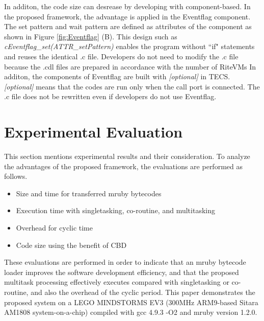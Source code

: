 \documentclass[conference,compsoc]{IEEEtran}
\begin{document}
In additon, the code size can desrease by developing with component-based. 
In the proposed framework, the advantage is applied in the Eventflag component.
The set pattern and wait pattern are defined as attributes of the component as shown in Figure \ref{fig:Eventflag} (B).
This design such as {\it cEventflag\_set(ATTR\_setPattern)} enables the program without ``if" statements and reuses the identical .c file.
Developers do not need to modify the .c file because the .cdl files are prepared in accordance with the number of RiteVMs
In additon, the components of Eventflag are built with {\it [optional]} in TECS.
{\it [optional]} means that the codes are run only when the call port is connected.
The .c file does not be rewritten even if developers do not use Eventflag. 

\section{Experimental Evaluation}
\label{sec:Evaluation}
This section mentions experimental results and their consideration.
To analyze the advantages of the proposed framework, the evaluations are performed as follows.
\begin{itemize}
    \item Size and time for transferred mruby bytecodes
    \item Execution time with singletasking, co-routine, and multitasking
    \item Overhead for cyclic time
    \item Code size using the benefit of CBD 
\end{itemize}

These evaluations are performed in order to indicate that an mruby bytecode loader improves the software development efficiency, and that the proposed multitask processing effectively executes compared with singletasking or co-routine, and also the overhead of the cyclic period.
This paper demonstrates the proposed system on a LEGO MINDSTORMS EV3 (300MHz ARM9-based Sitara AM1808 system-on-a-chip) compiled with gcc 4.9.3 -O2 and mruby version 1.2.0.
\end{document}
